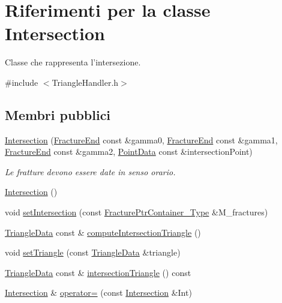 \hypertarget{classIntersection}{\section{Riferimenti per la classe Intersection}
\label{classIntersection}
}


Classe che rappresenta l'intersezione.  




{\ttfamily \#include $<$Triangle\-Handler.\-h$>$}

\subsection*{Membri pubblici}
\begin{DoxyCompactItemize}
\item 
\hyperlink{classIntersection_ad0bef2cc1bd1f80e72e4b265e19225ca}{Intersection} (\hyperlink{classFractureEnd}{Fracture\-End} const \&gamma0, \hyperlink{classFractureEnd}{Fracture\-End} const \&gamma1, \hyperlink{classFractureEnd}{Fracture\-End} const \&gamma2, \hyperlink{classPointData}{Point\-Data} const \&intersection\-Point)
\begin{DoxyCompactList}\small\item\em Le fratture devono essere date in senso orario. \end{DoxyCompactList}\item 
\hyperlink{classIntersection_a67497e3efe2793b23909052eeb82c4f3}{Intersection} ()
\item 
void \hyperlink{classIntersection_a6694ead6072e98dffe4a7c70379ca83b}{set\-Intersection} (const \hyperlink{FractureHandler_8h_a2f0b57e18ecf89912d7de0c87158009e}{Fracture\-Ptr\-Container\-\_\-\-Type} \&M\-\_\-fractures)
\item 
\hyperlink{classTriangleData}{Triangle\-Data} const \& \hyperlink{classIntersection_ae9d2fb8951a9f5a2bd7c1a96d73226f4}{compute\-Intersection\-Triangle} ()
\item 
void \hyperlink{classIntersection_ae071ecb3d3f2d6f9723e310764535883}{set\-Triangle} (const \hyperlink{classTriangleData}{Triangle\-Data} \&triangle)
\item 
\hyperlink{classTriangleData}{Triangle\-Data} const \& \hyperlink{classIntersection_a603d1cb4b33762c72999968ceec95a39}{intersection\-Triangle} () const 
\item 
\hyperlink{classIntersection}{Intersection} \& \hyperlink{classIntersection_a8cc823fe1b873994d49bc46b3b4136ef}{operator=} (const \hyperlink{classIntersection}{Intersection} \&Int)
\end{DoxyCompactItemize}


